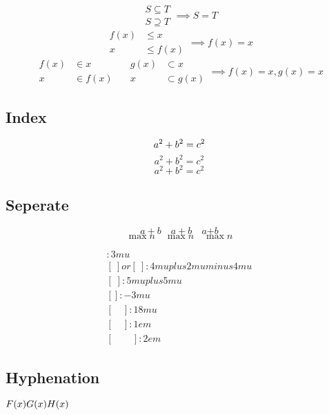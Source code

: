 \begin{equation}
    \begin{gathered}
        S \subseteq T \\
        S \supseteq T
    \end{gathered}
    \implies S = T
\end{equation}      %
\begin{equation}
    \begin{aligned}
        f(x) &\leq x \\
        x    &\leq f(x)
    \end{aligned}
    \implies f(x) = x
\end{equation}      %
\begin{equation}
    \begin{alignedat}{2}
        f(x) &\in x &\quad g(x) &\subset x \\
        x    &\in f(x) &\quad x &\subset g(x)
    \end{alignedat}
    \implies f(x) = x, g(x) = x
\end{equation}      %

\subsection{Index}
\begin{equation}
    a^2 + b^2 = c^2 \notag
\end{equation}
\begin{equation*}
    a^2 + b^2 = c^2 \tag{$\star $}
\end{equation*}
\begin{equation*}
    a^2 + b^2 = c^2 \tag*{[gougu]}
\end{equation*}

\subsection{Seperate}
\[
    a + b \quad a {+} b \quad a \mathord{+} b
\]
\[
    \max n \quad {\max} n \quad \mathord{\max} n
\]

\begin{gather}
    [\,]\colon 3mu \\
    [\:] or [\>]\colon 4mu plus 2mu minus 4mu \\
    [\;]\colon 5mu plus 5mu \\
    [\!]\colon -3mu \\
    [\mspace{18mu}]\colon 18mu \\
    [\quad]\colon 1em \\
    [\qquad]\colon 2em
\end{gather}

\subsection{Hyphenation}
$ F(x)\* G(x)\* H(x) $
